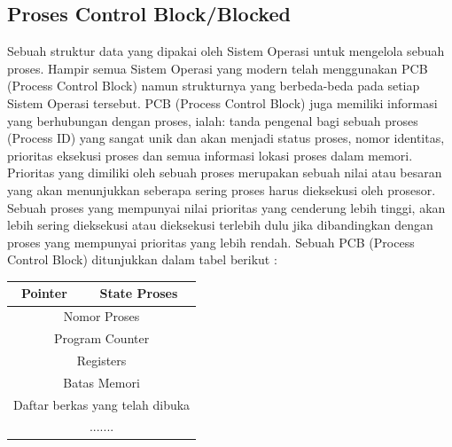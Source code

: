 	\subsection{Proses Control Block/Blocked}
	Sebuah struktur data yang dipakai oleh Sistem Operasi untuk mengelola sebuah proses. Hampir semua Sistem Operasi yang modern telah menggunakan PCB (Process Control Block) namun strukturnya yang berbeda-beda pada setiap Sistem Operasi tersebut. PCB (Process Control Block) juga memiliki informasi yang berhubungan dengan proses, ialah: tanda pengenal bagi sebuah proses (Process ID) yang sangat unik dan akan menjadi status proses, nomor identitas, prioritas eksekusi proses dan semua informasi lokasi proses dalam memori. Prioritas yang dimiliki oleh sebuah proses merupakan sebuah nilai atau besaran yang akan menunjukkan seberapa sering proses harus dieksekusi oleh prosesor. Sebuah proses yang mempunyai nilai prioritas yang cenderung lebih tinggi, akan lebih sering dieksekusi atau dieksekusi terlebih dulu jika dibandingkan dengan proses yang mempunyai prioritas yang lebih rendah.
	Sebuah PCB (Process Control Block) ditunjukkan dalam tabel berikut : 
	
	\begin{table}[H]
		\begin{tabular}{|c|c|}
			\hline
			Pointer & State Proses\\
			\hline
			\multicolumn{2}{|c|}{Nomor Proses}\\
			\hline
			\multicolumn{2}{|c|}{Program Counter}\\
			\hline
			\multicolumn{2}{|c|}{Registers}\\
			\hline
			\multicolumn{2}{|c|}{Batas Memori}\\
			\hline
			\multicolumn{2}{|c|}{Daftar berkas yang telah dibuka}\\
			\hline
			\multicolumn{2}{|c|}{.......}\\
		\end{tabular}
	\end{table}

